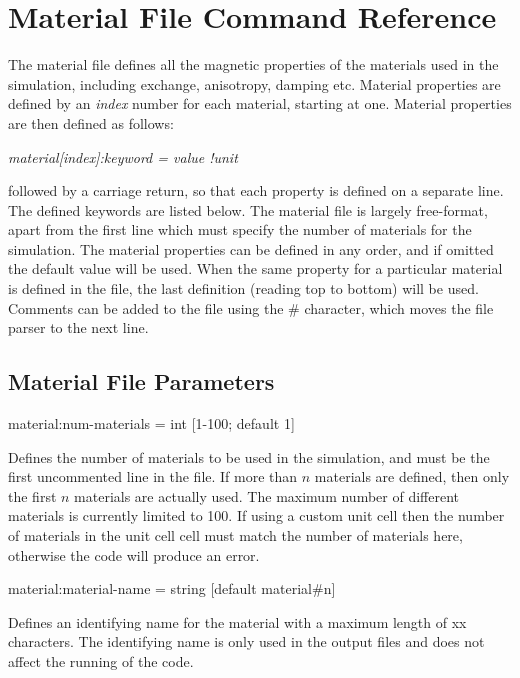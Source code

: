 
\chapter{Material File Command Reference}\label{chap:MaterialFileCommandReference} The material file defines all the magnetic properties of the materials used in the simulation, including exchange, anisotropy, damping etc. Material properties are defined by an \textit{index} number for each material, starting at one. Material properties are then defined as follows:

\textit{material[index]:keyword = value !unit}

\noindent followed by a carriage return, so that each property is defined on a separate line. The defined keywords are listed below. The material file is largely free-format, apart from the first line which must specify the number of materials for the simulation. The material properties can be defined in any order, and if omitted the default value will be used. When the same property for a particular material is defined in the file, the last definition (reading top to bottom) will be used. Comments can be added to the file using the \# character, which moves the file parser to the next line.

\section*{Material File Parameters}

{\zicf material:num-materials = int [1-100; default 1]} Defines the number of materials to be used in the simulation, and must be the first uncommented line in the file. If more than $n$ materials are defined, then only the first $n$ materials are actually used. The maximum number of different materials is currently limited to 100. If using a custom unit cell then the number of materials in the unit cell cell must match the number of materials here, otherwise the code will produce an error.

{\zicf material:material-name = string [default material\#n]} Defines an identifying name for the material with a maximum length of xx characters. The identifying name is only used in the output files and does not affect the running of the code.


